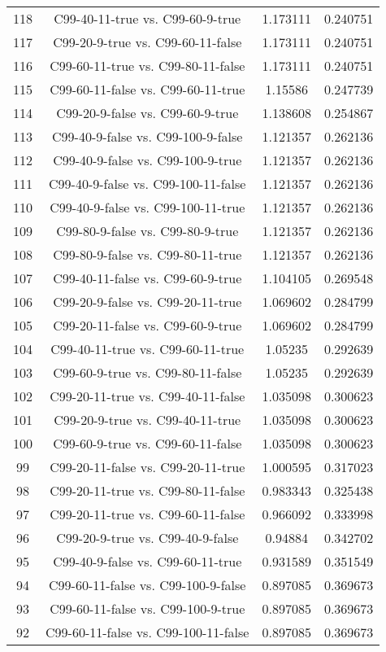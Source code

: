 \documentclass[a4paper,10pt]{article}
\begin{document}
\begin{landscape}
\begin{table}[!htp]
\begin{tabular}{cccc}
118&C99-40-11-true vs. C99-60-9-true&1.173111&0.240751\\
117&C99-20-9-true vs. C99-60-11-false&1.173111&0.240751\\
116&C99-60-11-true vs. C99-80-11-false&1.173111&0.240751\\
115&C99-60-11-false vs. C99-60-11-true&1.15586&0.247739\\
114&C99-20-9-false vs. C99-60-9-true&1.138608&0.254867\\
113&C99-40-9-false vs. C99-100-9-false&1.121357&0.262136\\
112&C99-40-9-false vs. C99-100-9-true&1.121357&0.262136\\
111&C99-40-9-false vs. C99-100-11-false&1.121357&0.262136\\
110&C99-40-9-false vs. C99-100-11-true&1.121357&0.262136\\
109&C99-80-9-false vs. C99-80-9-true&1.121357&0.262136\\
108&C99-80-9-false vs. C99-80-11-true&1.121357&0.262136\\
107&C99-40-11-false vs. C99-60-9-true&1.104105&0.269548\\
106&C99-20-9-false vs. C99-20-11-true&1.069602&0.284799\\
105&C99-20-11-false vs. C99-60-9-true&1.069602&0.284799\\
104&C99-40-11-true vs. C99-60-11-true&1.05235&0.292639\\
103&C99-60-9-true vs. C99-80-11-false&1.05235&0.292639\\
102&C99-20-11-true vs. C99-40-11-false&1.035098&0.300623\\
101&C99-20-9-true vs. C99-40-11-true&1.035098&0.300623\\
100&C99-60-9-true vs. C99-60-11-false&1.035098&0.300623\\
99&C99-20-11-false vs. C99-20-11-true&1.000595&0.317023\\
98&C99-20-11-true vs. C99-80-11-false&0.983343&0.325438\\
97&C99-20-11-true vs. C99-60-11-false&0.966092&0.333998\\
96&C99-20-9-true vs. C99-40-9-false&0.94884&0.342702\\
95&C99-40-9-false vs. C99-60-11-true&0.931589&0.351549\\
94&C99-60-11-false vs. C99-100-9-false&0.897085&0.369673\\
93&C99-60-11-false vs. C99-100-9-true&0.897085&0.369673\\
92&C99-60-11-false vs. C99-100-11-false&0.897085&0.369673\\

\end{tabular}
\end{table}
\end{landscape}
\end{document}
